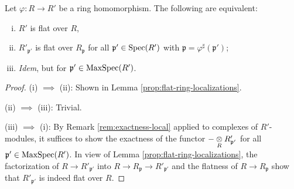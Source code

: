\begin{proposition}\label{prop:flatness-localized}
	Let $\varphi: R \to R'$ be a ring homomorphism. The following are equivalent:
	\begin{enumerate}[(i)]
		\item $R'$ is flat over $R$,
		\item $R'_{\mathfrak{p}'}$ is flat over $R_{\mathfrak{p}}$ for all $\mathfrak{p}' \in \operatorname{Spec}(R')$ with $\mathfrak{p} = \varphi^\sharp(\mathfrak{p}')$;
		\item \emph{Idem}, but for $\mathfrak{p}' \in \operatorname{MaxSpec}(R')$.
	\end{enumerate}
\end{proposition}
\begin{proof}
	(i) $\implies$ (ii): Shown in Lemma \ref{prop:flat-ring-localizations}.
	
	(ii) $\implies$ (iii): Trivial.
	
	(iii) $\implies$ (i): By Remark \ref{rem:exactness-local} applied to complexes of $R'$-modules, it suffices to show the exactness of the functor $- \underset{R}{\otimes} R'_{\mathfrak{p}'}$ for all $\mathfrak{p}' \in \operatorname{MaxSpec}(R')$. In view of Lemma \ref{prop:flat-ring-localizations}, the factorization of $R \to R'_{\mathfrak{p}'}$ into $R \to R_{\mathfrak{p}} \to R'_{\mathfrak{p}'}$ and the flatness of $R \to R_{\mathfrak{p}}$ show that $R'_{\mathfrak{p}'}$ is indeed flat over $R$.
\end{proof}

